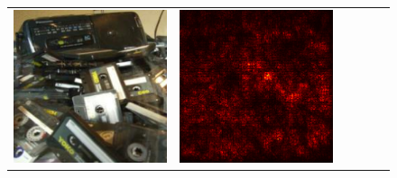 \documentclass[preprint,12pt]{elsarticle}
\begin{document}
\begin{figure}[p]
\begin{tabular}{cccccc}
  \includegraphics[scale=\scale]{../visualizations/examples/imagenette/resnet18/images/2.png} &
  \includegraphics[scale=\scale]{../visualizations/examples/imagenette/resnet18/saliency_map/2.png} & 

\end{tabular}
\end{figure}
\end{document}
